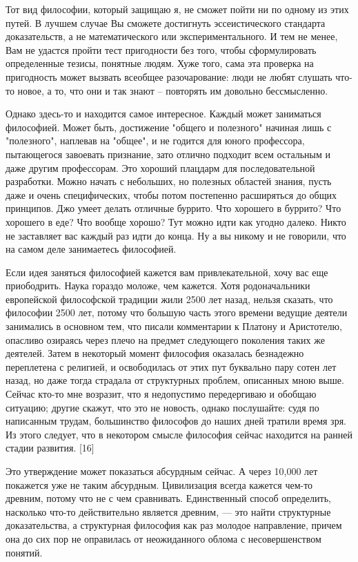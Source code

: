 \documentclass[ebook,12pt,oneside,openany]{memoir}
\begin{document}
Тот вид философии, который защищаю я, не сможет пойти ни по одному из
этих путей. В лучшем случае Вы сможете достигнуть эссеистического
стандарта доказательств, а не математического или экспериментального.
И тем не менее, Вам не удастся пройти тест пригодности без того, чтобы
сформулировать определенные тезисы, понятные людям. Хуже того, сама
эта проверка на пригодность может вызвать всеобщее разочарование: люди
не любят слушать что-то новое, а то, что они и так знают -- повторять
им довольно бессмысленно.

Однако здесь-то и находится самое интересное. Каждый может заниматься
философией. Может быть, достижение "общего и полезного" начиная лишь с
"полезного", наплевав на "общее", и не годится для юного профессора,
пытающегося завоевать признание, зато отлично подходит всем остальным
и даже другим профессорам. Это хороший плацдарм для последовательной
разработки. Можно начать с небольших, но полезных областей знания,
пусть даже и очень специфических, чтобы потом постепенно расширяться
до общих принципов. Джо умеет делать отличные буррито. Что хорошего в
буррито? Что хорошего в еде? Что вообще хорошо? Тут можно идти как
угодно далеко. Никто не заставляет вас каждый раз идти до конца. Ну а
вы никому и не говорили, что на самом деле занимаетесь философией.

Если идея заняться философией кажется вам привлекательной, хочу вас
еще приободрить. Наука гораздо моложе, чем кажется. Хотя
родоначальники европейской философской традиции жили 2500 лет назад,
нельзя сказать, что философии 2500 лет, потому что большую часть этого
времени ведущие деятели занимались в основном тем, что писали
комментарии к Платону и Аристотелю, опасливо озираясь через плечо на
предмет следующего поколения таких же деятелей. Затем в некоторый
момент философия оказалась безнадежно переплетена с религией, и
освободилась от этих пут буквально пару сотен лет назад, но даже тогда
страдала от структурных проблем, описанных мною выше. Сейчас кто-то
мне возразит, что я недопустимо передергиваю и обобщаю ситуацию;
другие скажут, что это не новость, однако послушайте: судя по
написанным трудам, большинство философов до наших дней тратили время
зря. Из этого следует, что в некотором смысле философия сейчас
находится на ранней стадии развития. [16]

Это утверждение может показаться абсурдным сейчас. А через 10,000 лет
покажется уже не таким абсурдным. Цивилизация всегда кажется чем-то
древним, потому что не с чем сравнивать. Единственный способ
определить, насколько что-то действительно является древним, — это
найти структурные доказательства, а структурная философия как раз
молодое направление, причем она до сих пор не оправилась от
неожиданного облома с несовершенством понятий.
\end{document}
